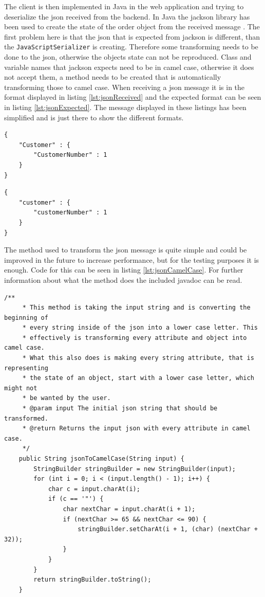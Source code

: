 The client is then implemented in Java in the web application and trying to \gls{deserialize} the \gls{json} received from the backend. In Java the jackson library has been used to create the state of the order object from the received message \citep{website:jackson}. The first problem here is that the \gls{json} that is expected from jackson is different, than the \texttt{JavaScriptSerializer} is creating. Therefore some transforming needs to be done to the \gls{json}, otherwise the objects state can not be reproduced. Class and variable names that jackson expects need to be in camel case, otherwise it does not accept them, a method needs to be created that is automatically transforming those to camel case. When receiving a \gls{json} message it is in the format displayed in listing \ref{lst:jsonReceived} and the expected format can be seen in listing \ref{lst:jsonExpected}. The message displayed in these listings has been simplified and is just there to show the different formats.

\begin{lstlisting}[frame=single, caption=Received JSON format, label=lst:jsonReceived]
{
	"Customer" : {
		"CustomerNumber" : 1	
	}
}
\end{lstlisting}

\begin{lstlisting}[frame=single, caption=Expected JSON format, label=lst:jsonExpected]
{
	"customer" : {
		"customerNumber" : 1	
	}
}
\end{lstlisting}

The method used to transform the \gls{json} message is quite simple and could be improved in the future to increase performance, but for the testing purposes it is enough. Code for this can be seen in listing \ref{lst:jsonCamelCase}. For further information about what the method does the included javadoc can be read.

\lstset{language=Java}
\begin{lstlisting}[frame=single, caption=Java Code to Transform JSON, label=lst:jsonCamelCase]
    /**
     * This method is taking the input string and is converting the beginning of
     * every string inside of the json into a lower case letter. This 
     * effectively is transforming every attribute and object into camel case.
     * What this also does is making every string attribute, that is representing
     * the state of an object, start with a lower case letter, which might not
     * be wanted by the user.
     * @param input The initial json string that should be transformed.
     * @return Returns the input json with every attribute in camel case.
     */
    public String jsonToCamelCase(String input) {
        StringBuilder stringBuilder = new StringBuilder(input);
        for (int i = 0; i < (input.length() - 1); i++) {
            char c = input.charAt(i);
            if (c == '"') {
                char nextChar = input.charAt(i + 1);
                if (nextChar >= 65 && nextChar <= 90) {
                    stringBuilder.setCharAt(i + 1, (char) (nextChar + 32));
                }
            }
        }
        return stringBuilder.toString();
    }
\end{lstlisting}

